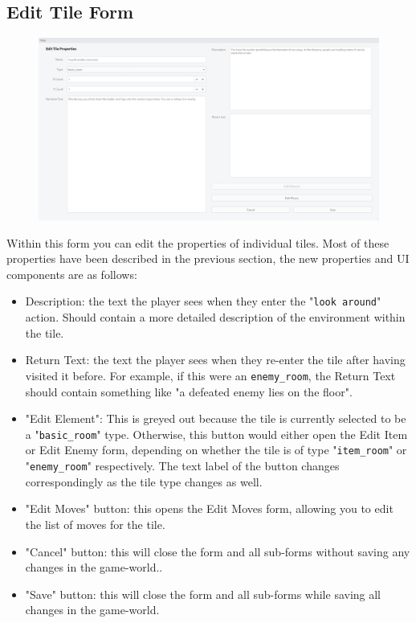 \documentclass{article} \usepackage[margin=1in,headheight=57pt,headsep=0.1in]{geometry}
\begin{document}
\subsection{Edit Tile Form}
\begin{figure}[H]
	\centering
	\includegraphics[width=1.0\textwidth]{./editTileFormBasic.png}
\end{figure}
Within this form you can edit the properties of individual tiles. Most of these properties have been described in the previous section, the new properties and UI components are as follows:
\begin{itemize}
	\item Description: the text the player sees when they enter the "\texttt{look around}" action. Should contain a more detailed description of the environment within the tile.
	\item Return Text: the text the player sees when they re-enter the tile after having visited it before. For example, if this were an \texttt{enemy\_room}, the Return Text should contain something like "a defeated enemy lies on the floor".
	\item "Edit Element": This is greyed out because the tile is currently selected to be a "\texttt{basic\_room}" type. Otherwise, this button would either open the Edit Item or Edit Enemy form, depending on whether the tile is of type "\texttt{item\_room}" or "\texttt{enemy\_room}" respectively. The text label of the button changes correspondingly as the tile type changes as well.
	\item "Edit Moves" button: this opens the Edit Moves form, allowing you to edit the list of moves for the tile.
	\item "Cancel" button: this will close the form and all sub-forms without saving any changes in the game-world..
	\item "Save" button: this will close the form and all sub-forms while saving all changes in the game-world.
\end{itemize}
\newpage
\end{document}
